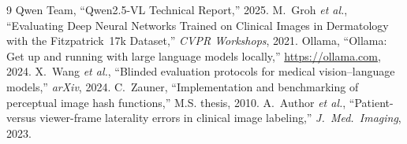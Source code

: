 \documentclass[conference]{IEEEtran}
\begin{document}
\begin{thebibliography}{9}
 Qwen Team, ``Qwen2.5-VL Technical Report,'' 2025.
 M.~Groh \emph{et al.}, ``Evaluating Deep Neural Networks Trained on Clinical Images in Dermatology with the Fitzpatrick~17k Dataset,'' \emph{CVPR Workshops}, 2021.
 Ollama, ``Ollama: Get up and running with large language models locally,'' \url{https://ollama.com}, 2024.
 X.~Wang \emph{et al.}, ``Blinded evaluation protocols for medical vision--language models,'' \emph{arXiv}, 2024.
 C.~Zauner, ``Implementation and benchmarking of perceptual image hash functions,'' M.S. thesis, 2010.
 A.~Author \emph{et al.}, ``Patient- versus viewer-frame laterality errors in clinical image labeling,'' \emph{J.~Med.~Imaging}, 2023.
\end{thebibliography}
\end{document}
